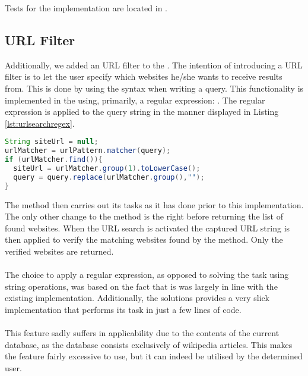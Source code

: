 Tests for the implementation are located in .

\subsection{URL Filter}
Additionally, we added an URL filter to the . The intention of introducing a URL filter is to let the user specify which websites he/she wants to receive results from. This is done by using the syntax  when writing a query. This functionality is implemented in the  using, primarily, a regular expression: . The regular expression is applied to the query string in the manner displayed in Listing \ref{lst:urlsearchregex}. \\
\begin{lstlisting}[language=Java, caption=Applying the regular expression, label=lst:urlsearchregex]
String siteUrl = null;
urlMatcher = urlPattern.matcher(query);
if (urlMatcher.find()){
  siteUrl = urlMatcher.group(1).toLowerCase();
  query = query.replace(urlMatcher.group(),"");
}
\end{lstlisting}
The  method then carries out its tasks as it has done prior to this implementation. The only other change to the method is the  right before returning the list of found websites. When the URL search is activated the captured URL string is then applied to verify the matching websites found by the method. Only the verified websites are returned. \\ \\
The choice to apply a regular expression, as opposed to solving the task using string operations, was based on the fact that is was largely in line with the existing implementation. Additionally, the solutions provides a very slick implementation that performs its task in just a few lines of code.
\\ \\
This feature sadly suffers in applicability due to the contents of the current database, as the database consists exclusively of wikipedia articles. This makes the feature fairly excessive to use, but it can indeed be utilised by the determined user. 
